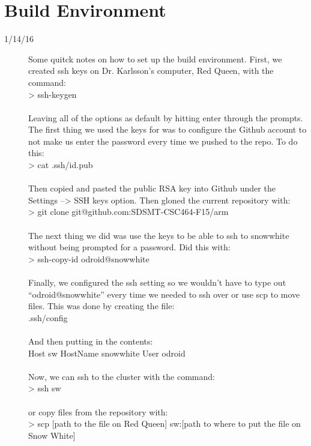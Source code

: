 \section{Build Environment}
\begin{description}
\item [1/14/16] Some quitck notes on how to set up the build environment. First, we created ssh keys on Dr. Karlsson's computer, Red Queen, with the command: \\
> ssh-keygen \\ \\
Leaving all of the options as default by hitting enter through the prompts.  The first thing we used the keys for was to configure the Github account to not make us enter the password every time we pushed to the repo. To do this: \\
> cat .ssh/id\textunderscore .pub \\ \\
Then copied and pasted the public RSA key into Github under the Settings --> SSH keys option. Then gloned the current repository with: \\
> git clone git@github.com:SDSMT-CSC464-F15/arm \\ \\
The next thing we did was use the keys to be able to ssh to snow\textunderscore white without being prompted for a password. Did this with: \\
> ssh-copy-id odroid@snow\textunderscore white \\ \\
Finally, we configured the ssh setting so we wouldn't have to type out ``odroid@snow\textunderscore white'' every time we needed to ssh over or use scp to move files. This was done by creating the file: \\
.ssh/config \\ \\
And then putting in the contents: \\
Host sw 
	HostName snow\textunderscore white
	User odroid \\ \\
Now, we can ssh to the cluster with the command: \\
> ssh sw \\ \\
or copy files from the repository with: \\
> scp [path to the file on Red Queen] sw:[path to where to put the file on Snow White]
\end{description}


